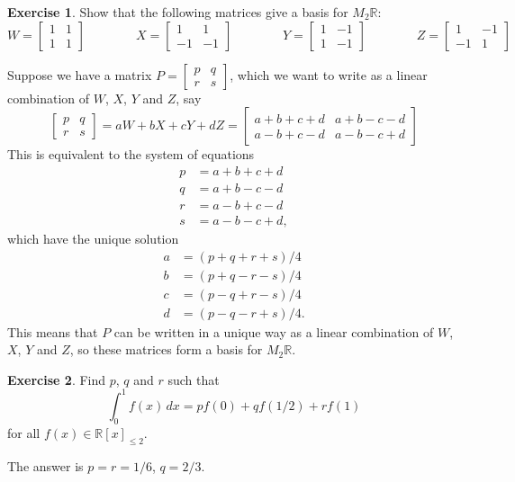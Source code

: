 \documentclass[a4paper]{amsart}
\newcommand{\R}         {{\mathbb{R}}}
\newcommand{\bpm}       {\left[\begin{matrix}}
\newcommand{\epm}       {\end{matrix}\right]}
\renewcommand{\:}{\colon}
\theoremstyle{definition}
\newtheorem{exercise}{Exercise}
\newenvironment{solution}{{\noindent \bf Solution:}}{}
\begin{document}


\begin{exercise}
 Show that the following matrices give a basis for $M_2\R$:
 \[ W = \bpm 1&1\\1&1\epm \hspace{4em}
    X = \bpm 1&1\\-1&-1\epm \hspace{4em}
    Y = \bpm 1&-1\\1&-1\epm \hspace{4em}
    Z = \bpm 1&-1\\-1&1\epm
 \]
\end{exercise}
\begin{solution}
 Suppose we have a matrix $P=\bpm p&q\\ r&s\epm$, which we want to
 write as a linear combination of $W$, $X$, $Y$ and $Z$, say
 \[ \bpm p&q\\ r&s\epm = aW+bX+cY+dZ =
     \bpm a+b+c+d & a+b-c-d \\ a-b+c-d & a-b-c+d \epm
 \]
 This is equivalent to the system of equations
 \begin{align*}
  p &= a+b+c+d \\
  q &= a+b-c-d \\
  r &= a-b+c-d \\
  s &= a-b-c+d,
 \end{align*}
 which have the unique solution
 \begin{align*}
  a &= (p+q+r+s)/4 \\
  b &= (p+q-r-s)/4 \\
  c &= (p-q+r-s)/4 \\
  d &= (p-q-r+s)/4.
 \end{align*}
 This means that $P$ can be written in a unique way as a linear
 combination of $W$, $X$, $Y$ and $Z$, so these matrices form a
 basis for $M_2\R$.
\end{solution}

\begin{exercise}
 Find $p$, $q$ and $r$ such that
 \[ \int_0^1 f(x)\,dx = p f(0) + q f(1/2) + r f(1) \]
 for all $f(x)\in\R[x]_{\leq 2}$.
\end{exercise}
\begin{solution}
 The answer is $p=r=1/6$, $q=2/3$.
\end{solution}
\end{document}
